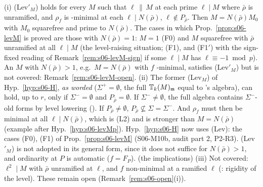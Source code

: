 \begin{remark}\label{rem:s06-levM-which}
(i) (Lev$'_M$) holds for every $M$ such that $\ell\,\|\,M$ at each prime $\ell\mid M$ where $\bar\rho$ is unramified, and $\rho_f$ is
\cite{KO}-minimal at each $\ell\mid N(\bar\rho)$, $\ell\notin P_{\bar\rho}$. Then $M=N(\bar\rho)M_0$ with $M_0$ squarefree and prime to $N(\bar\rho)$.
The cases in which Prop.~\ref{prop:s06-levM} is proved are those with $N(\bar\rho)=1$: $M=1$ (F0) and $M$ squarefree with
$\bar\rho$ unramified at all $\ell\mid M$ (the level-raising situation; (F1), and (F1$'$) with the sign-fixed reading of
Remark~\ref{rem:s06-levM-sign} if some $\ell\mid M$ has $\ell\equiv-1\bmod p$). \stpmc{} An $M$ with $N(\bar\rho)>1$, e.g.\ $M=N(\bar\rho)$ with $f$
\cite{KO}-minimal, satisfies (Lev$'_M$) but is not covered: Remark~\ref{rem:s06-levM-open}. \stopen
(ii) The former (Lev$_M$) of Hyp.~\ref{hyp:s06-H}, \emph{as worded} ($\Sigma^+=\emptyset$, the full $\mathbb{T}_k(M)_{\mathfrak{m}}$ equal to \cite{KO}'s algebra), can hold, up to
$r$, only if $\Sigma^-=\emptyset$ and $P_{\bar\rho}=\emptyset$. If $\Sigma^-\ne\emptyset$, the full algebra contains $\Sigma^-$-old forms by level
lowering (\cite[\S5, p.~15]{BKM}). If $P_{\bar\rho}\ne\emptyset$, $P_{\bar\rho}\not\subseteq\Sigma=\Sigma^-$. And $\rho_f$ must then be minimal at
all $\ell\mid N(\bar\rho)$, which is (L2) and is stronger than $M=N(\bar\rho)$ (example after Hyp.~\ref{hyp:s06-levMp}). Hyp.~\ref{hyp:s06-H} now
uses (Lev): the cases (F0), (F1) of Prop.~\ref{prop:s06-levM} (S06-M10b, audit part 2, P2-R3). (Lev$'_M$) is not adopted in its general
form, since it does not suffice for $N(\bar\rho)>1$, and ordinarity at $P$ is automatic ($f=F_P$). \stproved{} (the implications)
(iii) Not covered: $\ell^2\mid M$ with $\bar\rho$ unramified at $\ell$, and $f$ non-minimal at a ramified $\ell$ (\cite[Rem.~2.14(2), p.~7]{KO}:
rigidity of the level). These remain open (Remark~\ref{rem:s06-open}(i)). \stopen

\end{remark}

